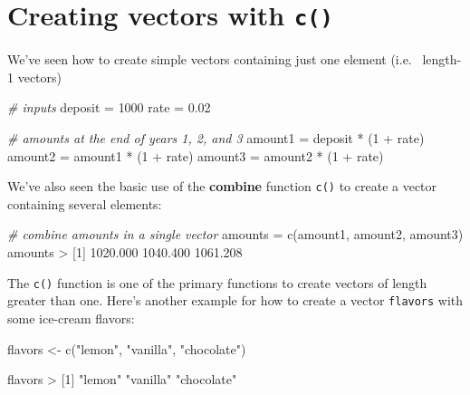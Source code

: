 \documentclass[
]{book}
\newenvironment{Shaded}{\begin{snugshade}}{\end{snugshade}}
\newcommand{\CommentTok}[1]{\textcolor[rgb]{0.56,0.35,0.01}{\textit{#1}}}
\newcommand{\DecValTok}[1]{\textcolor[rgb]{0.00,0.00,0.81}{#1}}
\newcommand{\FloatTok}[1]{\textcolor[rgb]{0.00,0.00,0.81}{#1}}
\newcommand{\FunctionTok}[1]{\textcolor[rgb]{0.00,0.00,0.00}{#1}}
\newcommand{\NormalTok}[1]{#1}
\newcommand{\OtherTok}[1]{\textcolor[rgb]{0.56,0.35,0.01}{#1}}
\newcommand{\SpecialCharTok}[1]{\textcolor[rgb]{0.00,0.00,0.00}{#1}}
\newcommand{\StringTok}[1]{\textcolor[rgb]{0.31,0.60,0.02}{#1}}
\begin{document}
\hypertarget{creating-vectors-with-c}{%
\section{\texorpdfstring{Creating vectors with \texttt{c()}}{Creating vectors with c()}}\label{creating-vectors-with-c}}

We've seen how to create simple vectors containing just one element (i.e.~
length-1 vectors)

\begin{Shaded}
\begin{Highlighting}[]
\CommentTok{\# inputs}
\NormalTok{deposit }\OtherTok{=} \DecValTok{1000}
\NormalTok{rate }\OtherTok{=} \FloatTok{0.02}

\CommentTok{\# amounts at the end of years 1, 2, and 3}
\NormalTok{amount1 }\OtherTok{=}\NormalTok{ deposit }\SpecialCharTok{*}\NormalTok{ (}\DecValTok{1} \SpecialCharTok{+}\NormalTok{ rate)}
\NormalTok{amount2 }\OtherTok{=}\NormalTok{ amount1 }\SpecialCharTok{*}\NormalTok{ (}\DecValTok{1} \SpecialCharTok{+}\NormalTok{ rate)}
\NormalTok{amount3 }\OtherTok{=}\NormalTok{ amount2 }\SpecialCharTok{*}\NormalTok{ (}\DecValTok{1} \SpecialCharTok{+}\NormalTok{ rate)}
\end{Highlighting}
\end{Shaded}

We've also seen the basic use of the \textbf{combine} function \texttt{c()} to create a
vector containing several elements:

\begin{Shaded}
\begin{Highlighting}[]
\CommentTok{\# combine amounts in a single vector}
\NormalTok{amounts }\OtherTok{=} \FunctionTok{c}\NormalTok{(amount1, amount2, amount3)}
\NormalTok{amounts}
\SpecialCharTok{\textgreater{}}\NormalTok{ [}\DecValTok{1}\NormalTok{] }\FloatTok{1020.000} \FloatTok{1040.400} \FloatTok{1061.208}
\end{Highlighting}
\end{Shaded}

The \texttt{c()} function is one of the primary functions to create vectors of length
greater than one. Here's another example for how to create a vector \texttt{flavors}
with some ice-cream flavors:

\begin{Shaded}
\begin{Highlighting}[]
\NormalTok{flavors }\OtherTok{\textless{}{-}} \FunctionTok{c}\NormalTok{(}\StringTok{"lemon"}\NormalTok{, }\StringTok{"vanilla"}\NormalTok{, }\StringTok{"chocolate"}\NormalTok{)}

\NormalTok{flavors}
\SpecialCharTok{\textgreater{}}\NormalTok{ [}\DecValTok{1}\NormalTok{] }\StringTok{"lemon"}     \StringTok{"vanilla"}   \StringTok{"chocolate"}
\end{Highlighting}
\end{Shaded}
\end{document}
